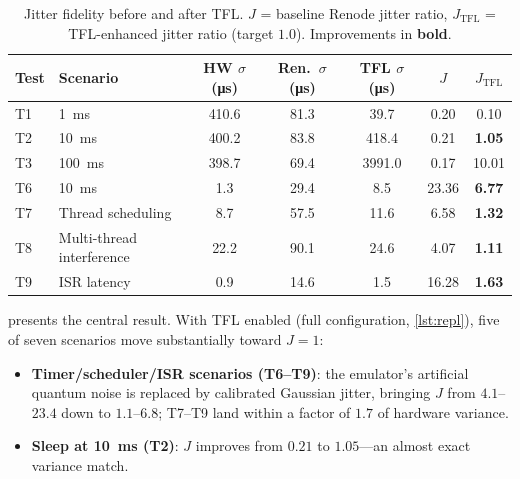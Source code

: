 \begin{table}[tb]
  \centering
  \caption[Jitter fidelity, baseline vs.\ TFL]{Jitter fidelity before
    and after TFL. $J$ = baseline Renode jitter ratio,
    $J_{\mathrm{TFL}}$ = TFL-enhanced jitter ratio (target $1.0$).
    Improvements in \textbf{bold}.}
  \label{tab:tfl}
  \small
  \begin{tabular}{@{}llS[table-format=2.1]S[table-format=2.1]S[table-format=4.1]S[table-format=2.2]S[table-format=2.2]@{}}
    \toprule
    Test & Scenario & {HW $\sigma$ (\si{\micro\second})} & {Ren.\ $\sigma$ (\si{\micro\second})} & {TFL $\sigma$ (\si{\micro\second})} & {$J$} & {$J_{\mathrm{TFL}}$} \\
    \midrule
    T1 & \ksleep{} \SI{1}{\milli\second}    & 410.6 & 81.3 & 39.7   & 0.20  & 0.10 \\
    T2 & \ksleep{} \SI{10}{\milli\second}   & 400.2 & 83.8 & 418.4  & 0.21  & {\bfseries 1.05} \\
    T3 & \ksleep{} \SI{100}{\milli\second}  & 398.7 & 69.4 & 3991.0 & 0.17  & 10.01 \\
    T6 & \ktimer{} \SI{10}{\milli\second}   & 1.3   & 29.4 & 8.5    & 23.36 & {\bfseries 6.77} \\
    T7 & Thread scheduling                  & 8.7   & 57.5 & 11.6   & 6.58  & {\bfseries 1.32} \\
    T8 & Multi-thread interference          & 22.2  & 90.1 & 24.6   & 4.07  & {\bfseries 1.11} \\
    T9 & ISR latency                        & 0.9   & 14.6 & 1.5    & 16.28 & {\bfseries 1.63} \\
    \bottomrule
  \end{tabular}
\end{table}

 presents the central result. With TFL enabled
(full configuration, \cref{lst:repl}), five of seven scenarios move
substantially toward $J = 1$:

\begin{itemize}
  \item \textbf{Timer/scheduler/ISR scenarios (T6--T9)}: the emulator's
        artificial quantum noise is replaced by calibrated Gaussian
        jitter, bringing $J$ from $4.1$--$23.4$ down to $1.1$--$6.8$;
        T7--T9 land within a factor of $1.7$ of hardware variance.
  \item \textbf{Sleep at \SI{10}{\milli\second} (T2)}: $J$ improves
        from $0.21$ to $1.05$---an almost exact variance match.
\end{itemize}

